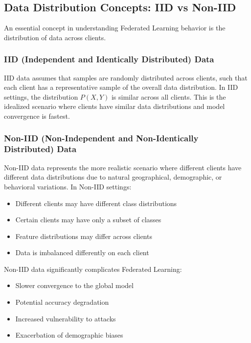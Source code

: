 \documentclass[11pt,a4paper]{report}
\begin{document}
\subsection{Data Distribution Concepts: IID vs Non-IID}

An essential concept in understanding Federated Learning behavior is the distribution of data across clients.

\subsubsection{IID (Independent and Identically Distributed) Data}

IID data assumes that samples are randomly distributed across clients, such that each client has a representative sample of the overall data distribution. In IID settings, the distribution $P(X,Y)$ is similar across all clients. This is the idealized scenario where clients have similar data distributions and model convergence is fastest.

\subsubsection{Non-IID (Non-Independent and Non-Identically Distributed) Data}

Non-IID data represents the more realistic scenario where different clients have different data distributions due to natural geographical, demographic, or behavioral variations. In Non-IID settings:

\begin{itemize}
    \item Different clients may have different class distributions
    \item Certain clients may have only a subset of classes
    \item Feature distributions may differ across clients
    \item Data is imbalanced differently on each client
\end{itemize}

Non-IID data significantly complicates Federated Learning:
\begin{itemize}
    \item Slower convergence to the global model
    \item Potential accuracy degradation
    \item Increased vulnerability to attacks
    \item Exacerbation of demographic biases
\end{itemize}
\end{document}

